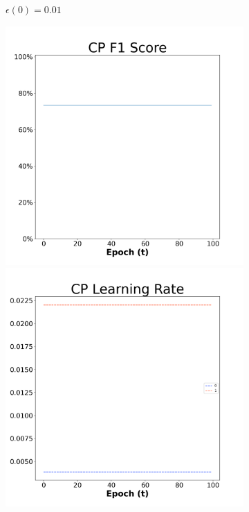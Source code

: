 \begin{figure}[H]
\begin{subfigure}{0.3\textwidth}
  \caption{$\epsilon(0)=0.01$}
\end{subfigure}\hfil %
\begin{subfigure}{0.3\textwidth}
  \includegraphics[width=\linewidth]{images/exper2/SP/CP_0.03_f1.png}
  \includegraphics[width=\linewidth]{images/exper2/SP/CP_0.03_lr.png}

\end{subfigure}
\end{figure}
